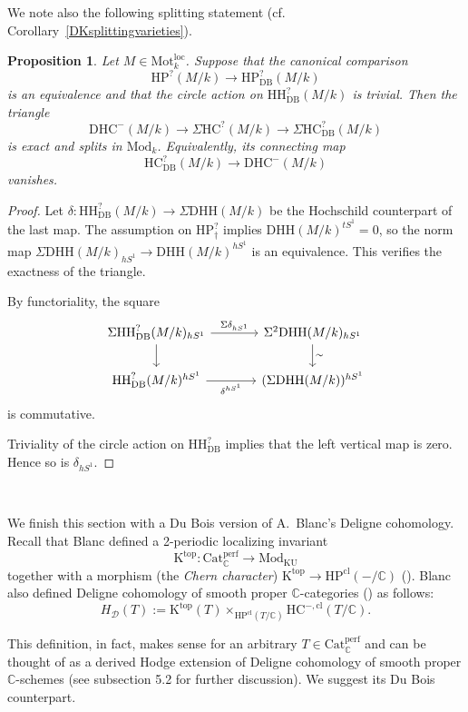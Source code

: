 \documentclass{amsart}
\theoremstyle{plain}
\newtheorem{prop}{Proposition}[section]
\theoremstyle{definition}
\newcommand{\ra}{\rightarrow}
\newcommand{\bbC}{\mathbb{C}}
\newcommand{\Catperf}{\mathrm{Cat}^{\mathrm{perf}}}
\newcommand{\Motloc}{\mathrm{Mot}^{\mathrm{loc}}}
\newcommand{\HH}{\mathrm{HH}}
\newcommand{\HC}{\mathrm{HC}}
\newcommand{\HP}{\mathrm{HP}}
\newcommand{\K}{\mathrm{K}}
\newcommand{\KU}{\mathrm{KU}}
\newcommand{\DHH}{\mathrm{DHH}}
\newcommand{\DHC}{\mathrm{DHC}}
\newcommand{\Mod}{\mathrm{Mod}}
\newcommand{\DB}{\mathrm{DB}}
\newcommand{\cl}{\mathrm{cl}}
\begin{document}
\medskip

We note also the following splitting statement (cf. Corollary~\ref{DKsplittingvarieties}).

\begin{prop}\label{DHCsplitting}
Let $M\in\Motloc_k$. Suppose that the canonical comparison
\[
\HP^?(M/k)\longrightarrow \HP^?_{\DB}(M/k)
\]
is an equivalence and that the circle action on $\HH^?_{\DB}(M/k)$
is trivial. Then the triangle
\[
\DHC^-(M/k)\longrightarrow\Sigma \HC^?(M/k)
\longrightarrow\Sigma \HC^?_{\DB}(M/k)
\]
is exact and splits in $\Mod_k$. Equivalently, its connecting map
\[
\HC^?_{\DB}(M/k)\longrightarrow \DHC^-(M/k)
\]
vanishes.
\end{prop}

\begin{proof}
Let
$\delta:\HH^?_{\DB}(M/k)\to\Sigma \DHH(M/k)$ be the Hochschild counterpart of the last map. The assumption on $\HP^?_\dagger$ implies $\DHH(M/k)^{tS^1}=0$, so the norm map
$\Sigma \DHH(M/k)_{hS^1}\to \DHH(M/k)^{hS^1}$ is an equivalence. This verifies the exactness of the triangle.

By functoriality, the square
\[
\begin{tikzcd}[column sep=large]
\Sigma \HH^?_{\DB}(M/k)_{hS^1}
 \arrow[r,"\Sigma\delta_{hS^1}"]\arrow[d,']
 &\Sigma^2\DHH(M/k)_{hS^1}\arrow[d,"\sim"]\\
\HH^?_{\DB}(M/k)^{hS^1}\arrow[r,"\delta^{hS^1}"']
 &(\Sigma \DHH(M/k))^{hS^1}
\end{tikzcd}
\] is commutative.

Triviality of the circle action on $\HH^?_{\DB}$ implies that the left vertical map is zero. Hence so is $\delta_{hS^1}$.
\end{proof}



\ \ 

We finish this section with a Du Bois version of A.~Blanc's Deligne cohomology. Recall that Blanc defined a
2-periodic localizing invariant
\[ \K^{\mathrm{top}}: \Catperf_\bbC \ra \Mod_{\KU}\] together with a morphism (the \emph{Chern character}) $\K^{\mathrm{top}}\ra \HP^{\cl}(-/\bbC)$ (\cite[Definition 4.13 and section 4.4]{Bla16}). Blanc also defined Deligne cohomology of smooth proper $\bbC$-categories (\cite[Definition 4.33]{Bla16}) as follows:
\[
H_{\mathcal D}(T):=
\K^{\mathrm{top}}(T)\mathop{\times}_{\HP^{\cl}(T/\bbC)}
\HC^{-,\cl}(T/\bbC).
\]

This definition, in fact, makes sense for an arbitrary $T\in \Catperf_\bbC$ and can be thought of as a derived Hodge extension of Deligne cohomology of smooth proper $\bbC$-schemes (see subsection 5.2 for further discussion). We suggest its Du Bois counterpart.
\end{document}
